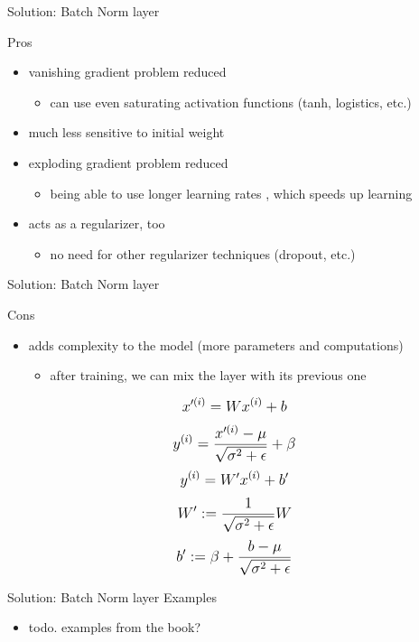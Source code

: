 \begin{frame}{Solution: Batch Norm layer}
	\begin{block}{Pros}
		\begin{itemize}
			\item vanishing gradient problem reduced
			\begin{itemize}
				\item can use even saturating activation functions (tanh, logistics, etc.)
			\end{itemize}
			\item much less sensitive to initial weight
			\item exploding gradient problem reduced
			\begin{itemize}
				\item being able to use longer learning rates , which speeds up learning
			\end{itemize}
			\item acts as a regularizer, too
			\begin{itemize}
				\item no need for other regularizer techniques (dropout, etc.)
			\end{itemize}
		\end{itemize}
	\end{block}
\end{frame}
\begin{frame}{Solution: Batch Norm layer}
	\begin{block}{Cons}
		\begin{itemize}
			\item adds complexity to the model (more parameters and computations)
			\begin{itemize}
				\item after training, we can mix the layer with its previous one
			\end{itemize}
		\end{itemize}
			\begin{equation}
				\mathlarger{x'^{(i)} = W x^{(i)} + b}
			\end{equation}
			\begin{equation}
				\mathlarger{y^{(i)} = \frac{x'^{(i)} - \mu}{\sqrt{\sigma^2 + \epsilon}} + \beta}
			\end{equation}
			\begin{equation}
				\mathlarger{y^{(i)} = W' x^{(i)} + b'}
			\end{equation}
			\begin{equation}
				\mathlarger{
					W' := \frac{1}{\sqrt{\sigma^2 + \epsilon}} W	
				}
			\end{equation}
			\begin{equation}
				\mathlarger{
					b' := \beta + \frac{b- \mu}{\sqrt{\sigma^2 + \epsilon}}	
				}
			\end{equation}
	\end{block}
\end{frame}
\begin{frame}{Solution: Batch Norm layer}
	Examples
	\begin{itemize}
		\item todo. examples from the book?
	\end{itemize}
\end{frame}